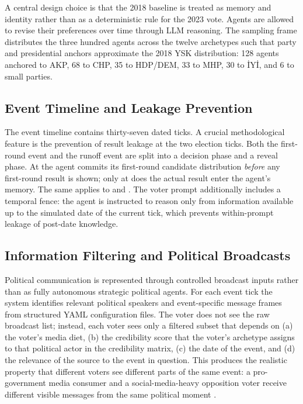 \documentclass[12pt,a4paper]{report}
\begin{document}
A central design choice is that the 2018 baseline is treated as memory and identity rather than as a deterministic rule for the 2023 vote. Agents are allowed to revise their preferences over time through LLM reasoning. The sampling frame distributes the three hundred agents across the twelve archetypes such that party and presidential anchors approximate the 2018 YSK distribution: 128 agents anchored to AKP, 68 to CHP, 35 to HDP/DEM, 33 to MHP, 30 to İYİ, and 6 to small parties.

\subsection{Event Timeline and Leakage Prevention}
\label{sec:timeline_methods}

The event timeline contains thirty-seven dated ticks. A crucial methodological feature is the prevention of result leakage at the two election ticks. Both the first-round event and the runoff event are split into a decision phase and a reveal phase. At  the agent commits its first-round candidate distribution \emph{before} any first-round result is shown; only at  does the actual result enter the agent's memory. The same applies to  and . The voter prompt additionally includes a temporal fence: the agent is instructed to reason only from information available up to the simulated date of the current tick, which prevents within-prompt leakage of post-date knowledge.

\subsection{Information Filtering and Political Broadcasts}
\label{sec:broadcasts_methods}

Political communication is represented through controlled broadcast inputs rather than as fully autonomous strategic political agents. For each event tick the system identifies relevant political speakers and event-specific message frames from structured YAML configuration files. The voter does not see the raw broadcast list; instead, each voter sees only a filtered subset that depends on (a) the voter's media diet, (b) the credibility score that the voter's archetype assigns to that political actor in the credibility matrix, (c) the date of the event, and (d) the relevance of the source to the event in question. This produces the realistic property that different voters see different parts of the same event: a pro-government media consumer and a social-media-heavy opposition voter receive different visible messages from the same political moment \citep{karaca2024socialmedia,najafi2024dataset,bozdag2022skeptical}.
\end{document}
